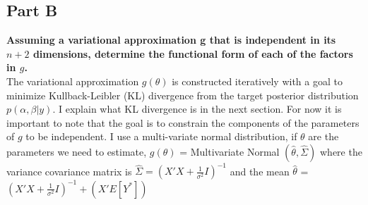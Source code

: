 \documentclass{article}
\begin{document}
\subsection{Part B}
\textbf{Assuming a variational approximation g that is independent in its $n + 2$ dimensions, determine the functional form of each of the factors in $g$.}\\
The variational approximation $g(\theta)$ is constructed iteratively with a goal to minimize Kullback-Leibler (KL) divergence from the target posterior distribution $p(\alpha, \beta |y)$. I explain what KL divergence is in the next section. For now it is important to note that the goal is to constrain the components of the parameters of $g$ to be independent. I use a multi-variate normal distribution, if $\theta$ are the parameters we need to estimate, $g(\theta)$ = Multivariate Normal $(\hat{\theta}, \hat{\Sigma})$ where the variance covariance matrix is $\hat{\Sigma} = (X'X + \frac{1}{\sigma^2} I)^{-1}$ and the mean $\hat{\theta}$ = $(X'X + \frac{1}{\sigma^2} I)^{-1} + (X' E[Y^*])$
\end{document}
